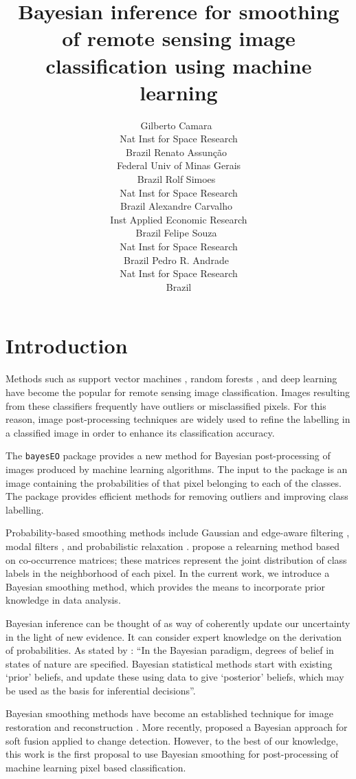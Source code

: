 \documentclass[
  shortnames]{jss}
\author{
Gilberto Camara~\orcidlink{0000-0002-3681-487X}\\Nat Inst for Space Research\\
Brazil \And Renato Assunção~\orcidlink{0000-0001-7442-9166}\\Federal Univ of Minas Gerais\\
Brazil \And Rolf Simoes~\orcidlink{0000-0003-0953-4132}\\Nat Inst for Space Research\\
Brazil \AND Alexandre Carvalho~\orcidlink{0000-0001-8762-5465}\\Inst Applied Economic Research\\
Brazil \And Felipe Souza~\orcidlink{0000-XXXXX}\\Nat Inst for Space Research\\
Brazil \And Pedro R. Andrade~\orcidlink{0000-0001-8675-4046}\\Nat Inst for Space Research\\
Brazil
}
\title{Bayesian inference for smoothing of remote sensing image classification using machine learning}
\begin{document}
\newpage

\hypertarget{introduction}{%
\section{Introduction}\label{introduction}}

Methods such as support vector machines \citep{Mountrakis2011}, random forests \citep{Belgiu2016}, and deep learning \citep{Ma2019} have become the popular for remote sensing image classification. Images resulting from these classifiers frequently have outliers or misclassified pixels. For this reason, image post-processing techniques are widely used to refine the labelling in a classified image in order to enhance its classification accuracy.

The \texttt{bayesEO} package provides a new method for Bayesian post-processing of images produced by machine learning algorithms. The input to the package is an image containing the probabilities of that pixel belonging to each of the classes. The package provides efficient methods for removing outliers and improving class labelling.

Probability-based smoothing methods include Gaussian and edge-aware filtering \citep{Schindler2012}, modal filters \citep{Ghimire2010}, and probabilistic relaxation
\citep{Gong1989}. \citet{Huang2014} propose a relearning method based on co-occurrence
matrices; these matrices represent the joint distribution of class labels in the
neighborhood of each pixel. In the current work, we introduce a Bayesian smoothing method,
which provides the means to incorporate prior knowledge in data analysis.

Bayesian inference can be thought of as way of coherently update our uncertainty in the
light of new evidence. It can consider expert knowledge on the derivation of
probabilities. As stated by \citet{Spiegelhalter2009}: ``In the Bayesian paradigm, degrees
of belief in states of nature are specified. Bayesian statistical methods start with
existing `prior' beliefs, and update these using data to give `posterior' beliefs,
which may be used as the basis for inferential decisions''.

Bayesian smoothing methods have become an established technique for image restoration and reconstruction \citep{Hanson1993}. More recently, \citet{Wu2017} proposed a Bayesian
approach for soft fusion applied to change detection. However, to the best of our knowledge,
this work is the first proposal to use Bayesian smoothing for post-processing of machine
learning pixel based classification.
\end{document}
